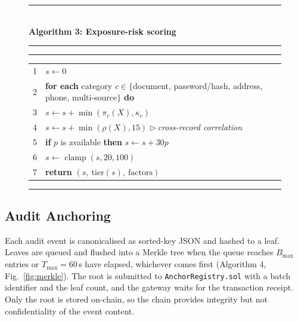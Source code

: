 \documentclass[10pt,twocolumn]{article}
\makeatletter
\newcommand{\algtop}[1]{\noindent\rule{\columnwidth}{0.6pt}\\[1pt]{\footnotesize\textbf{#1}}\\[-1pt]\rule{\columnwidth}{0.4pt}}
\newcommand{\algmid}{\noindent\rule{\columnwidth}{0.4pt}}
\newcommand{\algbot}{\noindent\rule{\columnwidth}{0.6pt}}
\newcommand{\cmt}[1]{\hfill$\triangleright$\,\textit{#1}}
\newcommand{\algtab}[1]{\par\vspace{1pt}\noindent\begin{tabular}{@{}r@{\hspace{5pt}}p{0.9\columnwidth}@{}}#1\end{tabular}\par}
\makeatother
\begin{document}
\begin{figure}[!t]
\algtop{Algorithm 3: Exposure-risk scoring}
\par\vspace{1pt}
\algmid
{\footnotesize
\algtab{
1 & $s \leftarrow 0$\\
2 & \textbf{for each} category $c\in\{$document, password/hash, address, phone, multi-source$\}$ \textbf{do}\\
3 & \hspace{1em}$s \leftarrow s + \min(\pi_c(X),\kappa_c)$\\
4 & $s \leftarrow s + \min(\rho(X),15)$ \cmt{cross-record correlation}\\
5 & \textbf{if} $p$ is available \textbf{then} $s \leftarrow s + 30p$\\
6 & $s \leftarrow \operatorname{clamp}(s,20,100)$\\
7 & \textbf{return} $(s,\ \mathrm{tier}(s),\ \text{factors})$}}
\algbot
\end{figure}

\subsection{Audit Anchoring}

Each audit event is canonicalised as sorted-key JSON and hashed to a leaf. Leaves are queued and flushed into a Merkle tree when the queue reaches $B_{\max}$ entries or $T_{\max}=60$\,s have elapsed, whichever comes first (Algorithm 4, Fig.~\ref{fig:merkle}). The root is submitted to \texttt{AnchorRegistry.sol} with a batch identifier and the leaf count, and the gateway waits for the transaction receipt. Only the root is stored on-chain, so the chain provides integrity but not confidentiality of the event content.
\end{document}
